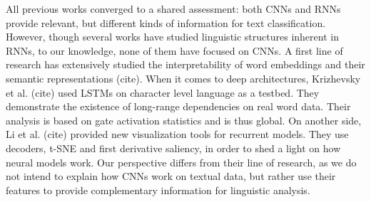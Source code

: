 
 All previous works converged to a shared assessment: both CNNs and RNNs provide relevant, but different kinds of information for text classification. 
 However, though several works have studied linguistic structures inherent in RNNs, to our knowledge, none of them have focused on CNNs. 
 A first line of research has extensively studied the interpretability of word embeddings and their semantic representations (cite). 
 When it comes to deep architectures, Krizhevsky et al. (cite) used LSTMs on character level language as a testbed. They demonstrate the existence of 
 long-range dependencies on real word data. Their analysis is based on gate activation statistics and is thus global. On another side, Li et al. (cite)
 provided new visualization tools for recurrent models. They use decoders, t-SNE and first derivative saliency, in order to shed a light on how neural models work.
Our perspective differs from their line of research, as we do not intend to explain how CNNs work on textual data, but rather use their features 
to provide complementary information for linguistic analysis.

